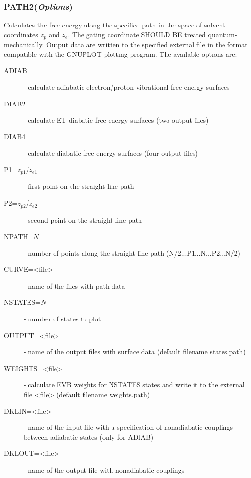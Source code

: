 \documentclass[oneside,11pt,openany]{book}
\newcommand{\tw}{\ttfamily}
\begin{document}
\subsubsection*{PATH2({\it Options})}
%
Calculates the free energy along the specified path
in the space of solvent coordinates $z_p$ and $z_e$.
The gating coordinate SHOULD BE treated quantum-mechanically.
Output data are written to the specified external
file in the format compatible with the GNUPLOT plotting
program. The available options are:
%
\begin{description}

\item[{\tw ADIAB}] - calculate adiabatic electron/proton vibrational
                     free energy surfaces

\item[{\tw DIAB2}] - calculate ET diabatic free energy surfaces
                     (two output files)

\item[{\tw DIAB4}] - calculate diabatic free energy surfaces
                     (four output files)

\item[{\tw P1=$z_{p1}$/$z_{e1}$}] - first point on the straight line path

\item[{\tw P2=$z_{p2}$/$z_{e2}$}] - second point on the straight line path

\item[{\tw NPATH=$N$}] - number of points along the straight line path
                         (N/2...P1...N...P2...N/2)

\item[{\tw CURVE=<file>}] - name of the files with path data

\item[{\tw NSTATES=$N$}] - number of states to plot

\item[{\tw OUTPUT=<file>}] - name of the output files with surface data
                             (default filename {\tw states.path})

\item[{\tw WEIGHTS=<file>}] - calculate EVB weights for {\tw NSTATES} states
                              and write it to the external file {\tw <file>}
                              (default filename {\tw weights.path})

\item[{\tw DKLIN=<file>}] - name of the input file with a specification
                            of nonadiabatic couplings between adiabatic
                            states (only for ADIAB)

\item[{\tw DKLOUT=<file>}] - name of the output file with nonadiabatic
                             couplings
\end{description}
\end{document}
